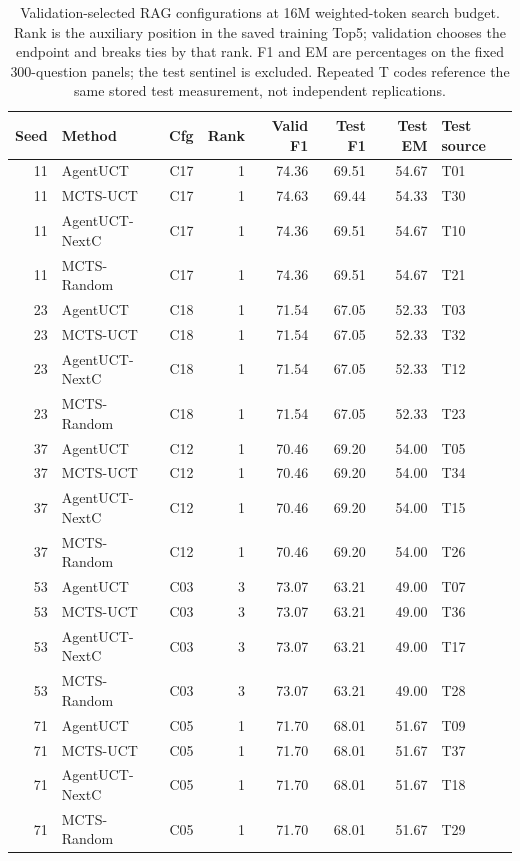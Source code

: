 \begin{table}[p]
\centering
\small
\setlength{\tabcolsep}{4pt}
\caption{Validation-selected RAG configurations at 16M weighted-token search budget. Rank is the auxiliary position in the saved training Top5; validation chooses the endpoint and breaks ties by that rank. F1 and EM are percentages on the fixed 300-question panels; the test sentinel is excluded. Repeated T codes reference the same stored test measurement, not independent replications.}
\label{tab:rag-best-configs-16m}
\begin{tabular}{@{}rlrrrrrl@{}}
\toprule
Seed & Method & Cfg & Rank & Valid F1 & Test F1 & Test EM & Test source \\
\midrule
11 & AgentUCT & C17 & 1 & 74.36 & 69.51 & 54.67 & T01 \\
11 & MCTS-UCT & C17 & 1 & 74.63 & 69.44 & 54.33 & T30 \\
11 & AgentUCT-NextC & C17 & 1 & 74.36 & 69.51 & 54.67 & T10 \\
11 & MCTS-Random & C17 & 1 & 74.36 & 69.51 & 54.67 & T21 \\
23 & AgentUCT & C18 & 1 & 71.54 & 67.05 & 52.33 & T03 \\
23 & MCTS-UCT & C18 & 1 & 71.54 & 67.05 & 52.33 & T32 \\
23 & AgentUCT-NextC & C18 & 1 & 71.54 & 67.05 & 52.33 & T12 \\
23 & MCTS-Random & C18 & 1 & 71.54 & 67.05 & 52.33 & T23 \\
37 & AgentUCT & C12 & 1 & 70.46 & 69.20 & 54.00 & T05 \\
37 & MCTS-UCT & C12 & 1 & 70.46 & 69.20 & 54.00 & T34 \\
37 & AgentUCT-NextC & C12 & 1 & 70.46 & 69.20 & 54.00 & T15 \\
37 & MCTS-Random & C12 & 1 & 70.46 & 69.20 & 54.00 & T26 \\
53 & AgentUCT & C03 & 3 & 73.07 & 63.21 & 49.00 & T07 \\
53 & MCTS-UCT & C03 & 3 & 73.07 & 63.21 & 49.00 & T36 \\
53 & AgentUCT-NextC & C03 & 3 & 73.07 & 63.21 & 49.00 & T17 \\
53 & MCTS-Random & C03 & 3 & 73.07 & 63.21 & 49.00 & T28 \\
71 & AgentUCT & C05 & 1 & 71.70 & 68.01 & 51.67 & T09 \\
71 & MCTS-UCT & C05 & 1 & 71.70 & 68.01 & 51.67 & T37 \\
71 & AgentUCT-NextC & C05 & 1 & 71.70 & 68.01 & 51.67 & T18 \\
71 & MCTS-Random & C05 & 1 & 71.70 & 68.01 & 51.67 & T29 \\
\bottomrule
\end{tabular}
\end{table}
